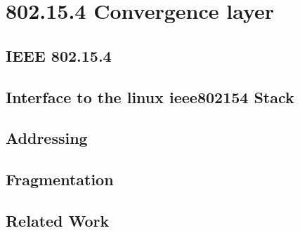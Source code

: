 \chapter{802.15.4 Convergence layer}
\section{IEEE 802.15.4}
\section{Interface to the linux ieee802154 Stack}
\section{Addressing}
\section{Fragmentation}
\section{Related Work}
